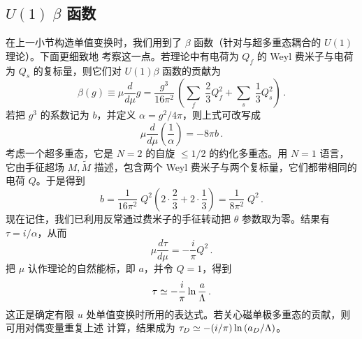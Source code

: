 \subsection{$U(1)\; \beta$ 函数}

在上一小节构造单值变换时，我们用到了 $\beta$ 函数（针对与超多重态耦合的 $U(1)$ 理论）。下面更细致地
考察这一点。若理论中有电荷为 $Q_{f}$ 的 Weyl 费米子与电荷为 $Q_{s}$ 的复标量，则它们对
$U(1) \beta$ 函数的贡献为
$$
\beta(g)\equiv\mu \frac{d}{d \mu}g = \frac{g^{3}}{16\pi^{2}} \,
\left( \sum_{f} \; \frac{2}{3} Q^{2}_{f} +
\sum_{s} \; \frac{1}{3} Q^{2}_{s} \right )\,.
$$
若把 $g^3$ 的系数记为 $b$，并定义 $\alpha= g^2/4\pi$，则上式可改写成
$$
\mu \frac{d}{d\mu} \left( \frac{1}{\alpha} \right) = - 8\pi b\,.
$$
考虑一个超多重态，它是 $N = 2$ 的自旋 $\leq 1/2$ 的约化多重态。用 $N=1$ 语言，它由手征超场
$M,\widetilde M$ 描述，包含两个 Weyl 费米子与两个复标量，它们都带相同的电荷 $Q$。于是得到
$$
b = \frac{1}{16\pi^{2}} \; Q^{2} \left(2 \cdot \frac{2}{3} +
2 \cdot \frac{1}{3} \right) = \frac{1}{8\pi^{2}}\; Q^{2}\,.
$$
现在记住，我们已利用反常通过费米子的手征转动把 $\theta$ 参数取为零。结果有 $\tau=i/\alpha$，从而
$$
\mu \frac{d\tau}{d\mu} = - \frac{i}{\pi} Q^{2}\,.
$$
把 $\mu$ 认作理论的自然能标，即 $a$，并令 $Q=1$，得到
$$
\tau \simeq - \frac{i}{\pi}\,{\rm ln}\,\frac{a}{\Lambda}\,.
$$
这正是确定有限 $u$ 处单值变换时所用的表达式。若关心磁单极多重态的贡献，则可用对偶变量重复上述
计算，结果成为 $\tau_D\simeq -(i/\pi)\, {\rm ln}\,(a_D/\Lambda)$。





